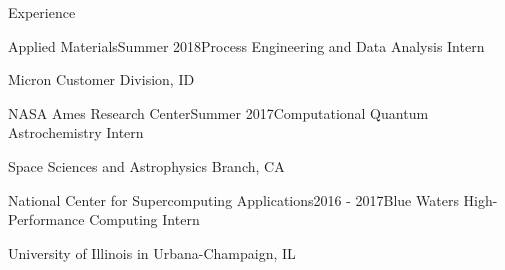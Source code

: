 \documentclass{resume} %
\begin{document}
\begin{rSection}{Experience}

\begin{rSubsection}{Applied Materials}{Summer 2018}{Process Engineering and Data Analysis Intern}{}
\item Micron Customer Division, ID
\end{rSubsection}


\begin{rSubsection}{NASA Ames Research Center}{Summer 2017}{Computational Quantum Astrochemistry Intern}{}
\item Space Sciences and Astrophysics Branch, CA
\end{rSubsection}


\begin{rSubsection}{National Center for Supercomputing Applications}{2016 - 2017}{Blue Waters High-Performance Computing Intern}{}
\item University of Illinois in Urbana-Champaign, IL
\end{rSubsection}

\end{rSection}
\end{document}
